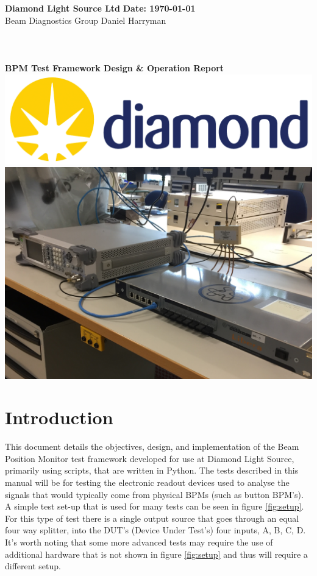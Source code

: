 \documentclass[a4paper, 11pt]{article}
\begin{document}
\normalsize
\noindent
\large\textbf{Diamond Light Source Ltd} \hfill\large\textbf{Date: \today}
\\\normalsize Beam Diagnostics Group \hfill Daniel Harryman\\
\centering\\
\section*{}
\vspace{5mm}
\huge\textbf{BPM Test Framework Design \& Operation Report}
\vspace{5mm}
\includegraphics[width = 1\textwidth]{Logo.PNG}
\includegraphics[width = 1\textwidth]{SimpleHW.jpg}
\normalsize
\clearpage
\tableofcontents
\listoffigures
\raggedright
\clearpage
\section{Introduction}
This document details the objectives, design, and implementation of the Beam Position Monitor test framework developed for use at Diamond Light Source, primarily using scripts, that are written in Python. The tests described in this manual will be for testing the electronic readout devices used to analyse the signals that would typically come from physical BPMs (such as button BPM's). A simple test set-up that is used for many tests can be seen in figure \ref{fig:setup}. For this type of test there is a single output source that goes through an equal four way splitter, into the DUT's (Device Under Test's) four inputs, A, B, C, D. It's worth noting that some more advanced tests may require the use of additional hardware that is not shown in figure \ref{fig:setup} and thus will require a different setup. 
\end{document}
